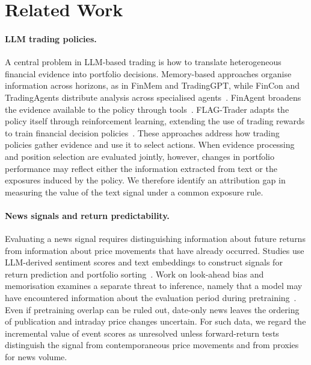 \section{Related Work}

\paragraph{LLM trading policies.}
A central problem in LLM-based trading is how to translate heterogeneous financial evidence into portfolio decisions. Memory-based approaches organise information across horizons, as in FinMem and TradingGPT, while FinCon and TradingAgents distribute analysis across specialised agents~\cite{yu2024finmem,li2023tradinggpt,yu2024fincon,xiao2024tradingagents}. FinAgent broadens the evidence available to the policy through tools~\cite{zhang2024finagent}. FLAG-Trader adapts the policy itself through reinforcement learning, extending the use of trading rewards to train financial decision policies~\cite{liu2022finrlmeta,wang2025flagtrader}. These approaches address how trading policies gather evidence and use it to select actions. When evidence processing and position selection are evaluated jointly, however, changes in portfolio performance may reflect either the information extracted from text or the exposures induced by the policy. We therefore identify an attribution gap in measuring the value of the text signal under a common exposure rule.

\paragraph{News signals and return predictability.}
Evaluating a news signal requires distinguishing information about future returns from information about price movements that have already occurred. Studies use LLM-derived sentiment scores and text embeddings to construct signals for return prediction and portfolio sorting~\cite{lopezlira2023chatgpt,kirtac2024sentiment,chen2022expected}. Work on look-ahead bias and memorisation examines a separate threat to inference, namely that a model may have encountered information about the evaluation period during pretraining~\cite{glasserman2023lookahead,lopezlira2025memorization,gao2025lookahead}. Even if pretraining overlap can be ruled out, date-only news leaves the ordering of publication and intraday price changes uncertain. For such data, we regard the incremental value of event scores as unresolved unless forward-return tests distinguish the signal from contemporaneous price movements and from proxies for news volume.

